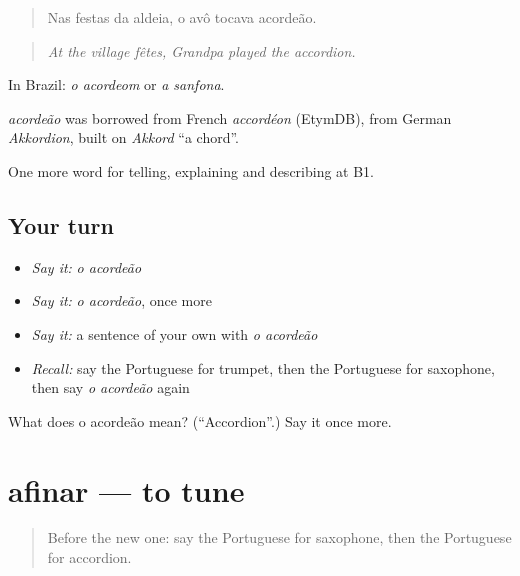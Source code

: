 \begin{quote}
Nas festas da aldeia, o avô tocava acordeão.
\end{quote}

\begin{quote}
\emph{At the village fêtes, Grandpa played the accordion.}
\end{quote}

In Brazil: \emph{o acordeom} or \emph{a sanfona}.

\begin{cousinweb}
\emph{acordeão} was borrowed from French \emph{accordéon} (EtymDB), from German \emph{Akkordion}, built on \emph{Akkord} \textquotedblleft{}a chord\textquotedblright{}.
\end{cousinweb}

\begin{grammarlens}[title={What you've built}]
One more word for telling, explaining and describing at B1.
\end{grammarlens}

\subsection*{Your turn}
\begin{itemize}
\raggedright
  \item \emph{Say it:} \emph{o acordeão}
  \item \emph{Say it:} \emph{o acordeão}, once more
  \item \emph{Say it:} a sentence of your own with \emph{o acordeão}
  \item \emph{Recall:} say the Portuguese for trumpet, then the Portuguese for saxophone, then say \emph{o acordeão} again
\end{itemize}

\begin{tcolorbox}[breakable,colback=teal!4,colframe=teal!35!black,title={Before you move on}]
What does o acordeão mean? (\textquotedblleft{}Accordion\textquotedblright{}.) Say it once more.
\end{tcolorbox}
\section[afinar]{afinar — to tune}

\label{lesson:PT-C517-afinar}



\begin{quote}
Before the new one: say the Portuguese for saxophone, then the Portuguese for accordion.
\end{quote}

